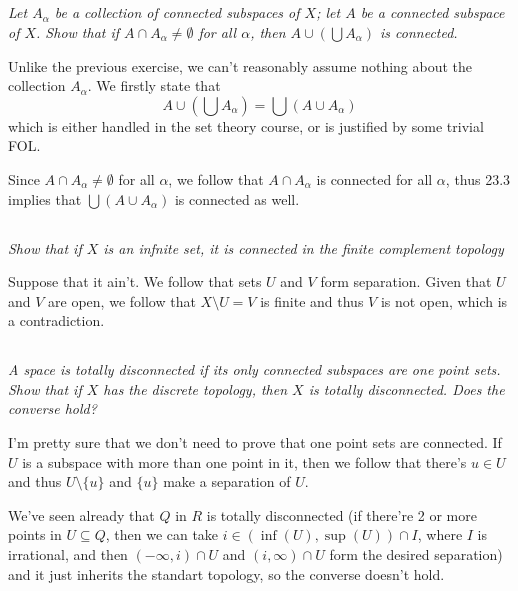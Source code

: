 \documentclass[11pt,oneside,titlepage]{book}
\newcommand{\set}[1]{\{ #1 \}}
\begin{document}
\subsection{}

\textit{Let $A_\alpha$ be a collection of connected subspaces of $X$; let $A$
  be a connected subspace of $X$. Show that if $A \cap A_\alpha \neq \emptyset$ for all $\alpha$,
  then $A \cup (\bigcup{A_\alpha})$ is connected.}

Unlike the previous exercise, we can't reasonably assume nothing about the collection $A_\alpha$.
We firstly state that
$$A \cup (\bigcup{A_\alpha}) = \bigcup{(A \cup A_\alpha)}$$
which is either handled in the set theory course, or is justified by some trivial FOL.

Since $A \cap A_\alpha \neq \emptyset$ for all $\alpha$, we follow that $A \cap A_\alpha$
is connected for all $\alpha$, thus 23.3 implies that $\bigcup{(A \cup A_\alpha)}$ is connected as
well.

\subsection{}

\textit{Show that if $X$ is an infnite set, it is connected in the finite complement topology}

Suppose that it ain't. We follow that sets $U$ and $V$ form separation. Given that
$U$ and $V$ are open, we follow that 
$X \setminus U = V$ is finite and thus $V$ is not open, which is a contradiction.

\subsection{}

\textit{A space is totally disconnected if its only connected subspaces are one point sets.
  Show that if $X$ has the discrete topology, then $X$ is totally disconnected. Does the
  converse hold?}

I'm pretty sure that we don't need to prove that one point sets are connected. If $U$ is a
subspace with more than one point in it, then we follow that there's $u \in U$ and thus
$U \setminus \set{u}$ and $\set{u}$ make a separation of $U$.

We've seen already that $Q$ in $R$ is totally disconnected (if there're 2 or more points
in $U \subseteq Q$, then we can take $i \in (\inf(U), \sup(U)) \cap I$, where $I$ is
irrational, and then $(-\infty, i) \cap U$ and $(i, \infty) \cap U$ form the desired separation)
and it just inherits the standart topology, so the converse doesn't hold.
\end{document}
